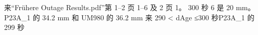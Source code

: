 \documentclass[11pt,a4paper]{article}
\begin{document}
{\cjkfont 来}\allowbreak{}“Frühere Outage Results.pdf”{\cjkfont 第}\allowbreak{} 1–2 {\cjkfont 页}\allowbreak{} 1–6 {\cjkfont 及}\allowbreak{} 2 {\cjkfont 页}\allowbreak{} 1{\cjkfont 。}\allowbreak{} 300 {\cjkfont 秒}\allowbreak{} 6 {\cjkfont 是}\allowbreak{} 20 mm{\cjkfont 。}\allowbreak{} P23A\_1 {\cjkfont 的}\allowbreak{} 34.2 mm {\cjkfont 和}\allowbreak{} UM980 {\cjkfont 的}\allowbreak{} 36.2 mm {\cjkfont 来}\allowbreak{} 290 < dAge ≤300 {\cjkfont 秒}\allowbreak{}P23A\_1 {\cjkfont 的}\allowbreak{} 299 {\cjkfont 秒}\allowbreak{}
\end{document}
